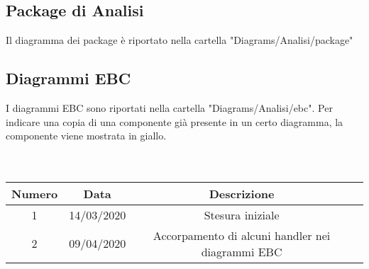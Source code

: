 \subsection{Package di Analisi}
Il diagramma dei package è riportato nella cartella "Diagrams/Analisi/package"

\subsection{Diagrammi EBC}
I diagrammi EBC sono riportati nella cartella "Diagrams/Analisi/ebc". Per indicare una copia di una componente già presente in un certo diagramma, la componente viene mostrata in giallo. \\

 \\ \\
\begin{tabular}{|c | c | c | c|} 
 	\hline
	 Numero & Data & Descrizione \\ [0.5ex] 
	\hline\hline
	1 & 14/03/2020 & Stesura iniziale \\ 
	\hline
	2 & 09/04/2020 & Accorpamento di alcuni handler nei diagrammi EBC \\
	\hline
\end{tabular}